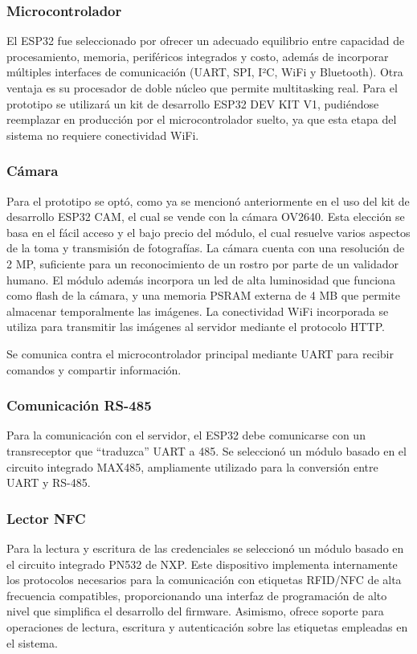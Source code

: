 \subsubsection{Microcontrolador}
El ESP32 fue seleccionado por ofrecer un adecuado equilibrio entre capacidad de procesamiento, memoria, periféricos integrados y costo, además de incorporar múltiples interfaces de comunicación (UART, SPI, I²C, WiFi y Bluetooth). 
Otra ventaja es su procesador de doble núcleo que permite multitasking real.
Para el prototipo se utilizará un kit de desarrollo ESP32 DEV KIT V1, pudiéndose reemplazar en producción por el microcontrolador suelto, ya que esta etapa del sistema no requiere conectividad WiFi.

\subsubsection{Cámara}
Para el prototipo se optó, como ya se mencionó anteriormente en el uso del kit de desarrollo ESP32 CAM, el cual se vende con la cámara OV2640.
Esta elección se basa en el fácil  acceso y el bajo precio del módulo, el cual resuelve varios aspectos de la toma y transmisión de fotografías. 
La cámara cuenta con una resolución de 2 MP, suficiente para un reconocimiento de un rostro por parte de un validador humano. El módulo además incorpora un led de alta luminosidad que funciona como flash de la cámara, y una memoria PSRAM externa de 4 MB que permite almacenar temporalmente las imágenes.
La conectividad WiFi incorporada se utiliza para transmitir las imágenes al servidor mediante el protocolo HTTP.

Se comunica contra el microcontrolador principal mediante UART para recibir comandos y compartir información.

\subsubsection{Comunicación RS-485}
Para la comunicación con el servidor, el ESP32 debe comunicarse con un transreceptor que \enquote{traduzca} UART a 485. Se seleccionó un módulo basado en el circuito integrado MAX485, ampliamente utilizado para la conversión entre UART y RS-485.

\subsubsection{Lector NFC}
Para la lectura y escritura de las credenciales se seleccionó un módulo basado en el circuito integrado PN532 de NXP. Este dispositivo implementa internamente los protocolos necesarios para la comunicación con etiquetas RFID/NFC de alta frecuencia compatibles, proporcionando una interfaz de programación de alto nivel que simplifica el desarrollo del firmware. Asimismo, ofrece soporte para operaciones de lectura, escritura y autenticación sobre las etiquetas empleadas en el sistema.

